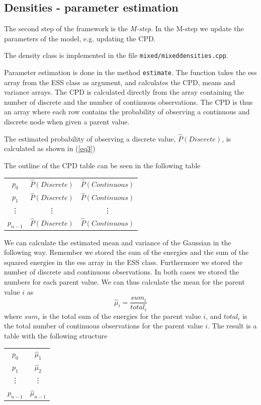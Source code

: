 \documentclass[10pt, journal, compsoc, a4paper]{IEEEtran}
\begin{document}
\subsection{Densities - parameter estimation} %
\label{sub:densities}
The second step of the framework is the \emph{M-step}. In the M-step we update the parameters of the model, e.g. updating the CPD.

The density class is implemented in the file \texttt{mixed/mixeddensities.cpp}. 

Parameter estimation is done in the method \texttt{estimate}. The function takes the ess array from the ESS class as argument, and calculates the CPD, means and variance arrays. The CPD is calculated directly from the array containing the number of discrete and the number of continuous observations. The CPD is thus an array where each row contains the probability of observing a continuous and discrete node when given a parent value. 

The estimated probability of observing a discrete value, $\hat{P}(Discrete)$, is calculated as shown in (\ref{eq3}) 

The outline of the CPD table can be seen in the following table 

\begin{center}
  \begin{tabular}{c | c | c}
  $p_0$ & $\hat{P}(Discrete)$ & $\hat{P}(Continuous)$\\
  $p_1$ & $\hat{P}(Discrete)$ & $\hat{P}(Continuous)$\\
  \vdots & \vdots & \vdots \\
  $p_{n-1}$ & $\hat{P}(Discrete)$ & $\hat{P}(Continuous)$ 
  \end{tabular}  
\end{center}

We can calculate the estimated mean and variance of the Gaussian in the following way. Remember we stored the sum of the energies and the sum of the squared energies in the ess array in the ESS class. Furthermore we stored the number of discrete and continuous observations. In both cases we stored the numbers for each parent value. We can thus calculate the mean for the parent value $i$ as
\begin{equation}
  \hat{\mu}_i = \frac{sum_i}{total_i} 
\end{equation}
where $sum_i$ is the total sum of the energies for the parent value $i$, and $total_i$ is the total number of continuous observations for the parent value $i$. The result is a table with the following structure
\begin{center}
  \begin{tabular}{c | c }
  $p_0$ & $\hat{\mu}_1$ \\
  $p_1$ & $\hat{\mu}_2$ \\
  \vdots & \vdots \\
  $p_{n-1}$ & $\hat{\mu}_{n-1}$  
  \end{tabular}  
\end{center}
\end{document}
